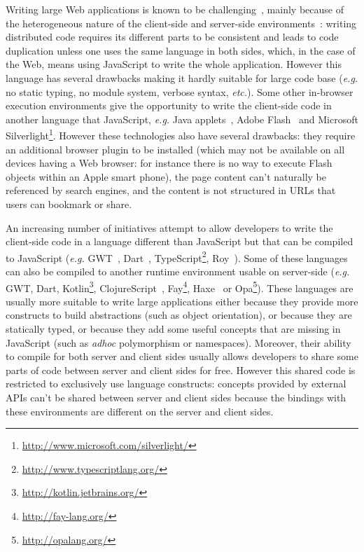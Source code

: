 \documentclass[american,english,runningheads]{llncs}
\newcommand{\eg}{\emph{e.g.}}
\newcommand{\etc}{\emph{etc.}}
\begin{document}
Writing large Web applications is known to be
challenging~\cite{Mikkonen08_SpaghettiJs,Preciado05_RIAMethodologyNecessity}, mainly because of the heterogeneous
nature of the client-side and server-side environments~\cite{Echeverria09_RIA,Kuuskeri09_PartitioningClientServer}:
writing distributed code requires its different parts to be consistent and leads to code duplication unless one uses
the same language in both sides, which, in the case of the Web, means using JavaScript to write the whole
application. However this language has several drawbacks making it hardly suitable for large code base (\eg{} no
static typing, no module system, verbose syntax, \etc). Some other in-browser execution environments give the
opportunity to write the client-side code in another language that JavaScript, \eg{} Java
applets~\cite{Anuff96_JavaApplets}, Adobe Flash~\cite{Curtis00_Flash} and Microsoft
Silverlight\footnote{\href{http://www.microsoft.com/silverlight/}{http://www.microsoft.com/silverlight/}}. However
these technologies also have several drawbacks: they require an additional browser plugin to be installed (which may
not be available on all devices having a Web browser: for instance there is no way to execute Flash objects within an
Apple smart phone), the page content can't naturally be referenced by search engines, and the content is not
structured in URLs that users can bookmark or share.

An increasing number of initiatives attempt to allow developers to write the client-side code in a language different
than JavaScript but that can be compiled to JavaScript (\eg{} GWT~\cite{Chaganti07_GWT}, Dart~\cite{Griffith11_Dart},
TypeScript\footnote{\href{http://www.typescriptlang.org/}{http://www.typescriptlang.org/}}, Roy~\cite{McKenna_Roy}).
Some of these languages can also be compiled to another runtime environment usable on server-side (\eg{} GWT, Dart,
Kotlin\footnote{\href{http://kotlin.jetbrains.org/}{http://kotlin.jetbrains.org/}},
ClojureScript~\cite{McGranaghan11_ClojureScript}, Fay\footnote{\href{http://fay-lang.org/}{http://fay-lang.org/}},
Haxe~\cite{Cannasse08_HaXe} or Opa\footnote{\href{http://opalang.org/}{http://opalang.org/}}). These languages are
usually more suitable to write large applications either because they provide more constructs to build abstractions
(such as object orientation), or because they are statically typed, or because they add some useful concepts
that are missing in JavaScript (such as \emph{adhoc} polymorphism or namespaces). Moreover, their ability to compile
for both server and client sides usually allows developers to share some parts of code between server and client
sides for free. However this shared code is restricted to exclusively use language constructs: concepts provided by
external APIs can't be shared between server and client sides because the bindings with these environments are
different on the server and client sides.
\end{document}
